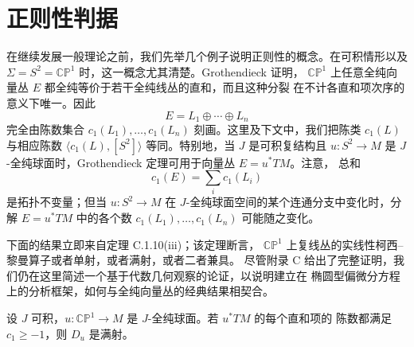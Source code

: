 
\section{正则性判据}\label{sec:3-3}

在继续发展一般理论之前，我们先举几个例子说明正则性的概念。在可积情形以及
$\Sigma=S^2=\mathbb{CP}^1$ 时，这一概念尤其清楚。Grothendieck  证明，
$\mathbb{CP}^1$ 上任意全纯向量丛 $E$ 都全纯等价于若干全纯线丛的直和，而且这种分裂
在不计各直和项次序的意义下唯一。因此
\[
  E=L_1\oplus\cdots\oplus L_n
\]
完全由陈数集合 $c_1(L_1),\ldots,c_1(L_n)$ 刻画。这里及下文中，我们把陈类 $c_1(L)$
与相应陈数 $\langle c_1(L),[S^2]\rangle$ 等同。特别地，当 $J$ 是可积复结构且
$u:S^2\to M$ 是 $J$-全纯球面时，Grothendieck 定理可用于向量丛 $E=u^*TM$。注意，
总和
\[
  c_1(E)=\sum_i c_1(L_i)
\]
是拓扑不变量；但当 $u:S^2\to M$ 在 $J$-全纯球面空间的某个连通分支中变化时，分解
$E=u^*TM$ 中的各个数 $c_1(L_1),\ldots,c_1(L_n)$ 可能随之变化。

下面的结果立即来自定理 C.1.10\textup{(iii)}；该定理断言，
$\mathbb{CP}^1$ 上复线丛的实线性柯西--黎曼算子或者单射，或者满射，或者二者兼具。
尽管附录 C 给出了完整证明，我们仍在这里简述一个基于代数几何观察的论证，以说明建立在
椭圆型偏微分方程上的分析框架，如何与全纯向量丛的经典结果相契合。

\begin{lemma}\label{lem:3-3-1}
设 $J$ 可积，$u:\mathbb{CP}^1\to M$ 是 $J$-全纯球面。若 $u^*TM$ 的每个直和项的
陈数都满足 $c_1\ge-1$，则 $D_u$ 是满射。
\end{lemma}

